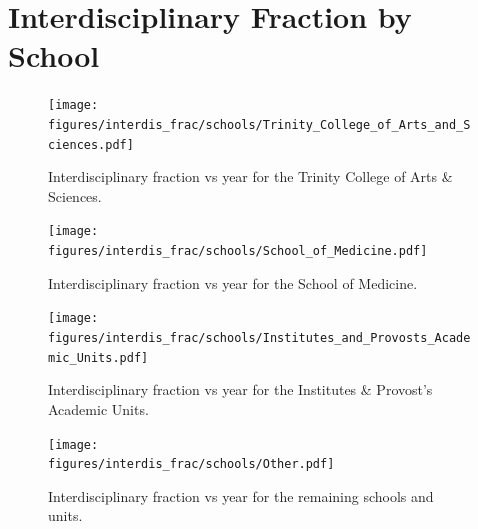 \documentclass[notitlepage,aps,prd,nofootinbib]{revtex4-1}
\newcommand{\figures}{../outputs/plots}
\begin{document}
\appendix*
\section{Interdisciplinary Fraction by School}

\begin{figure}[!htb]\centering
  \texttt{[image: \\figures/interdis\_frac/schools/Trinity\_College\_of\_Arts\_and\_Sciences.pdf]}
  \caption{Interdisciplinary fraction vs year for the Trinity College of Arts \& Sciences.}
\end{figure}

\begin{figure}[!htb]\centering
  \texttt{[image: \\figures/interdis\_frac/schools/School\_of\_Medicine.pdf]}
  \caption{Interdisciplinary fraction vs year for the School of Medicine.}
\end{figure}

\begin{figure}[!htb]\centering
  \texttt{[image: \\figures/interdis\_frac/schools/Institutes\_and\_Provosts\_Academic\_Units.pdf]}
  \caption{Interdisciplinary fraction vs year for the Institutes \& Provost's Academic Units.}
\end{figure}

\begin{figure}[!htb]\centering
  \texttt{[image: \\figures/interdis\_frac/schools/Other.pdf]}
  \caption{Interdisciplinary fraction vs year for the remaining schools and units.}
\end{figure}
\end{document}
